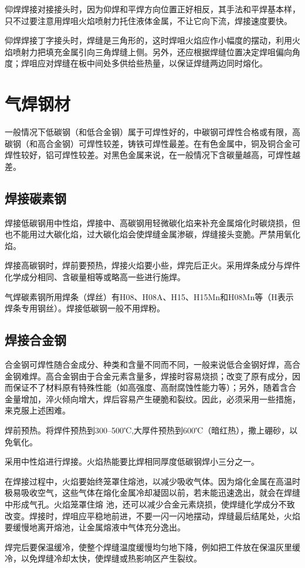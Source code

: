 \documentclass{ctexbook}
\begin{document}
仰焊焊接对接接头时，因为仰焊和平焊方向位置正好相反，其手法和平焊基本样，只不过要注意用焊咀火焰喷射力托住液体金属，不让它向下流，焊接速度要快。

仰焊焊接丁字接头时，焊缝是三角形的，这时焊咀火焰应作小幅度的摆动，利用火焰喷射力把填充金属引向三角焊缝上侧。另外，还应根据焊缝位置决定焊咀偏向角度；焊咀应对焊缝在板中间处多供给些热量，以保证焊缝两边同时熔化。
\section{气焊钢材}
一般情况下低碳钢（和低合金钢）属于可焊性好的，中碳钢可焊性合格或有限，高碳钢（和高合金钢）可焊性较差，铸铁可焊性最差。在有色金属中，铜及铜合金可焊性较好，铝可焊性较差。对黑色金属来说，在一般情况下含碳量越高，可焊性越差。
\subsection{焊接碳素钢}
焊接低碳钢用中性焰，焊接中、高碳钢用轻微碳化焰来补充金属熔化时碳烧损，但也不能用过大碳化焰，过大碳化焰会使焊缝金属渗碳，焊缝接头变脆。严禁用氧化焰。

焊接高碳钢时，焊前要预热，焊接火焰要小些，焊完后正火。采用焊条成分与焊件化学成分相同、含碳量相等或略高一些进行施焊。

气焊碳素钢所用焊条（焊丝）有H08、H08A、H15、H15Mn和H08Mn等（H表示焊条专用钢丝）。焊接低碳钢一般不用焊粉。
\subsection{焊接合金钢}
合金钢可焊性随合金成分、种类和含量不同而不同，一般来说低合金钢好焊，高合金钢难焊。高合金钢由于合金元素含量多，焊接时容易烧损；改变了原有成分，因而保证不了材料原有特殊性能（如高强度、高耐腐蚀性能力等）；另外，随着含合金量增加，淬火倾向增大，焊后容易产生硬脆和裂纹。因此，必须采用一些措施，来克服上述困难。

焊前预热。将焊件预热到300--500℃,大厚件预热到600℃（暗红热），撒上硼砂，以免氧化。

采用中性焰进行焊接。火焰热能要比焊相同厚度低碳钢焊小三分之一。

在焊接过程中，火焰要始终笼罩住熔池，以减少吸收气体。因为熔化金属在高温时极易吸收空气，这些气体在熔化金属冷却凝固以前，若未能迅速逸出，就会在焊缝中形成气孔。火焰笼罩住熔
池，还可以减少合金元素烧损，使焊缝化学成分不致改变。焊接时，焊咀应平稳地前进，不要一闪一闪地摆动，焊缝最后结尾处，火焰要缓慢地离开熔池，让金属熔液中气体充分逸出。

焊完后要保温缓冷，使整个焊缝温度缓慢均匀地下降，例如把工件放在保温灰里缓冷，以免焊缝冷却太快，使焊缝或热影响区产生裂纹。
\end{document}

